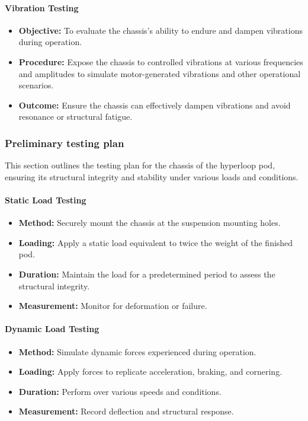 \paragraph{Vibration Testing}
\begin{itemize}
    \item \textbf{Objective:} To evaluate the chassis's ability to endure and dampen vibrations during operation.
    \item \textbf{Procedure:} Expose the chassis to controlled vibrations at various frequencies and amplitudes to simulate motor-generated vibrations and other operational scenarios.
    \item \textbf{Outcome:} Ensure the chassis can effectively dampen vibrations and avoid resonance or structural fatigue.
\end{itemize}


\subsubsection{Preliminary testing plan}

This section outlines the testing plan for the chassis of the hyperloop pod, ensuring its structural integrity and stability under various loads and conditions.

\paragraph{Static Load Testing}
\begin{itemize}
    \item \textbf{Method:} Securely mount the chassis at the suspension mounting holes.
    \item \textbf{Loading:} Apply a static load equivalent to twice the weight of the finished pod.
    \item \textbf{Duration:} Maintain the load for a predetermined period to assess the structural integrity.
    \item \textbf{Measurement:} Monitor for deformation or failure.
\end{itemize}

\paragraph{Dynamic Load Testing}
\begin{itemize}
    \item \textbf{Method:} Simulate dynamic forces experienced during operation.
    \item \textbf{Loading:} Apply forces to replicate acceleration, braking, and cornering.
    \item \textbf{Duration:} Perform over various speeds and conditions.
    \item \textbf{Measurement:} Record deflection and structural response.
\end{itemize}

